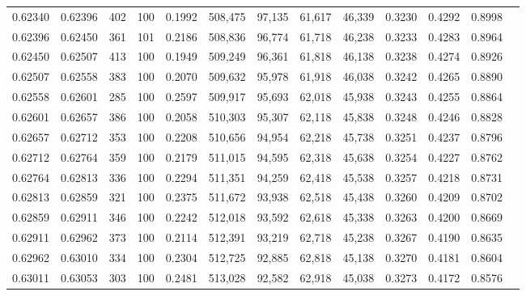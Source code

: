 \begin{tabular}{rrrrrrrrrrrrr}
0.62340 & 0.62396 &   402 & 100 &                                     0.1992 & 508,475 &  97,135 &  61,617 &  46,339 & 0.3230 & 0.4292 & 0.8998 \\
0.62396 & 0.62450 &   361 & 101 &                                     0.2186 & 508,836 &  96,774 &  61,718 &  46,238 & 0.3233 & 0.4283 & 0.8964 \\
0.62450 & 0.62507 &   413 & 100 &                                     0.1949 & 509,249 &  96,361 &  61,818 &  46,138 & 0.3238 & 0.4274 & 0.8926 \\
0.62507 & 0.62558 &   383 & 100 &                                     0.2070 & 509,632 &  95,978 &  61,918 &  46,038 & 0.3242 & 0.4265 & 0.8890 \\
0.62558 & 0.62601 &   285 & 100 &                                     0.2597 & 509,917 &  95,693 &  62,018 &  45,938 & 0.3243 & 0.4255 & 0.8864 \\
0.62601 & 0.62657 &   386 & 100 &                                     0.2058 & 510,303 &  95,307 &  62,118 &  45,838 & 0.3248 & 0.4246 & 0.8828 \\
0.62657 & 0.62712 &   353 & 100 &                                     0.2208 & 510,656 &  94,954 &  62,218 &  45,738 & 0.3251 & 0.4237 & 0.8796 \\
0.62712 & 0.62764 &   359 & 100 &                                     0.2179 & 511,015 &  94,595 &  62,318 &  45,638 & 0.3254 & 0.4227 & 0.8762 \\
0.62764 & 0.62813 &   336 & 100 &                                     0.2294 & 511,351 &  94,259 &  62,418 &  45,538 & 0.3257 & 0.4218 & 0.8731 \\
0.62813 & 0.62859 &   321 & 100 &                                     0.2375 & 511,672 &  93,938 &  62,518 &  45,438 & 0.3260 & 0.4209 & 0.8702 \\
0.62859 & 0.62911 &   346 & 100 &                                     0.2242 & 512,018 &  93,592 &  62,618 &  45,338 & 0.3263 & 0.4200 & 0.8669 \\
0.62911 & 0.62962 &   373 & 100 &                                     0.2114 & 512,391 &  93,219 &  62,718 &  45,238 & 0.3267 & 0.4190 & 0.8635 \\
0.62962 & 0.63010 &   334 & 100 &                                     0.2304 & 512,725 &  92,885 &  62,818 &  45,138 & 0.3270 & 0.4181 & 0.8604 \\
0.63011 & 0.63053 &   303 & 100 &                                     0.2481 & 513,028 &  92,582 &  62,918 &  45,038 & 0.3273 & 0.4172 & 0.8576 \\

\end{tabular}

